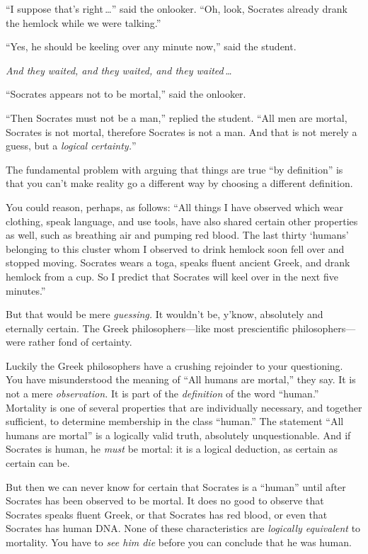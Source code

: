{ ``I suppose that's right\,\ldots'' said the onlooker. ``Oh,
look, Socrates already drank the hemlock while we were
talking.''


 ``Yes, he should be keeling over any minute
now,'' said the student.


 \textit{And they waited, and they waited, and they waited\,\ldots}


 ``Socrates appears not to be
mortal,'' said the onlooker.

{
 ``Then Socrates must not be a
man,'' replied the student. ``All
men are mortal, Socrates is not mortal, therefore Socrates is not a
man. And that is not merely a guess, but a \textit{logical
certainty.}''}


 The fundamental problem with arguing that things are true
``by definition'' is that you
can't make reality go a different way by choosing a
different definition.


 You could reason, perhaps, as follows: ``All
things I have observed which wear clothing, speak language, and use
tools, have also shared certain other properties as well, such as
breathing air and pumping red blood. The last thirty
`humans' belonging to this cluster whom
I observed to drink hemlock soon fell over and stopped moving. Socrates
wears a toga, speaks fluent ancient Greek, and drank hemlock from a
cup. So I predict that Socrates will keel over in the next five
minutes.''


 But that would be mere \textit{guessing.} It
wouldn't be, y'know, absolutely and
eternally certain. The Greek philosophers---like most prescientific
philosophers---were rather fond of certainty.


 Luckily the Greek philosophers have a crushing rejoinder to your
questioning. You have misunderstood the meaning of
``All humans are mortal,'' they say.
It is not a mere \textit{observation.} It is part of the
\textit{definition} of the word
``human.'' Mortality is one of
several properties that are individually necessary, and together
sufficient, to determine membership in the class
``human.'' The statement
``All humans are mortal'' is a
logically valid truth, absolutely unquestionable. And if Socrates is
human, he \textit{must} be mortal: it is a logical deduction, as
certain as certain can be.

{
 But then we can never know for certain that Socrates is a
``human'' until after Socrates has
been observed to be mortal. It does no good to observe that Socrates
speaks fluent Greek, or that Socrates has red blood, or even that
Socrates has human DNA. None of these characteristics are
\textit{logically equivalent} to mortality. You have to \textit{see him
die} before you can conclude that he was human.}


}
